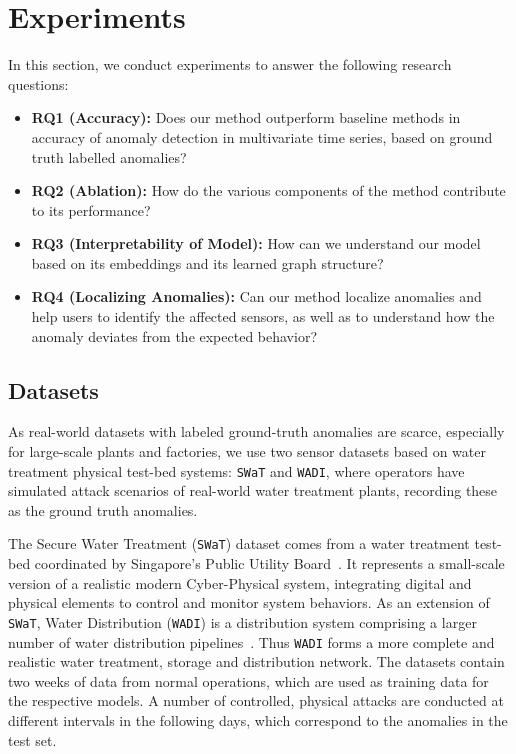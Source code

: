 \documentclass[letterpaper]{article} %
\begin{document}
\section{Experiments}
In this section, we conduct experiments to answer the following research questions:
\begin{itemize}
    \item \textbf{RQ1 (Accuracy):} Does our method outperform baseline methods in accuracy of anomaly detection in multivariate time series, based on ground truth labelled anomalies?
    \item \textbf{RQ2 (Ablation):} How do the various components of the method contribute to its performance?
    \item \textbf{RQ3 (Interpretability of Model):} How can we understand our model based on its embeddings and its learned graph structure?
    \item \textbf{RQ4 (Localizing Anomalies):} Can our method localize anomalies and help users to identify the affected sensors, as well as to understand how the anomaly deviates from the expected behavior?
\end{itemize}



\subsection{Datasets}
As real-world datasets with labeled ground-truth anomalies are scarce, especially for large-scale plants and factories, we use two sensor datasets based on water treatment physical test-bed systems: \texttt{SWaT} and \texttt{WADI}, where operators have simulated attack scenarios of real-world water treatment plants, recording these as the ground truth anomalies.

The Secure Water Treatment (\texttt{SWaT}) dataset comes from a water treatment test-bed coordinated by Singapore's Public Utility Board~\cite{dataset_swat}. It represents a small-scale version of a realistic modern Cyber-Physical system, integrating digital and physical elements to control and monitor system behaviors. As an extension of \texttt{SWaT}, Water Distribution (\texttt{WADI}) is a distribution system comprising a larger number of water distribution pipelines~\cite{dataset_wadi}. Thus \texttt{WADI} forms a more complete and realistic water treatment, storage and distribution network. The datasets contain two weeks of data from normal operations, which are used as training data for the respective models. A number of controlled, physical attacks are conducted at different intervals in the following days, which correspond to the anomalies in the test set.
\end{document}
